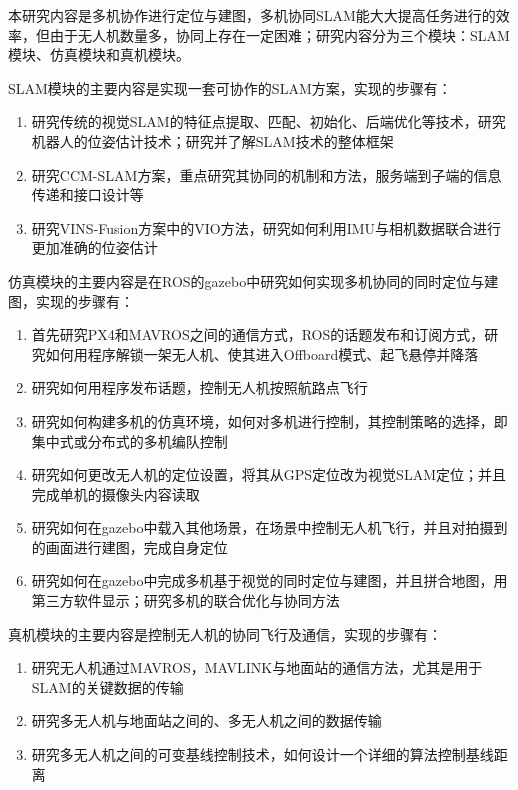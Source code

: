 本研究内容是多机协作进行定位与建图，多机协同SLAM能大大提高任务进行的效率，但由于无人机数量多，协同上存在一定困难；研究内容分为三个模块：SLAM模块、仿真模块和真机模块。

SLAM模块的主要内容是实现一套可协作的SLAM方案，实现的步骤有：

\begin{enumerate}
	\item 研究传统的视觉SLAM的特征点提取、匹配、初始化、后端优化等技术，研究机器人的位姿估计技术；研究并了解SLAM技术的整体框架
	\item 研究CCM-SLAM方案，重点研究其协同的机制和方法，服务端到子端的信息传递和接口设计等
	\item 研究VINS-Fusion方案中的VIO方法，研究如何利用IMU与相机数据联合进行更加准确的位姿估计
\end{enumerate}

仿真模块的主要内容是在ROS的gazebo中研究如何实现多机协同的同时定位与建图，实现的步骤有：

\begin{enumerate}
	\item 首先研究PX4和MAVROS之间的通信方式，ROS的话题发布和订阅方式，研究如何用程序解锁一架无人机、使其进入Offboard模式、起飞悬停并降落
	\item 研究如何用程序发布话题，控制无人机按照航路点飞行
	\item 研究如何构建多机的仿真环境，如何对多机进行控制，其控制策略的选择，即集中式或分布式的多机编队控制
	\item 研究如何更改无人机的定位设置，将其从GPS定位改为视觉SLAM定位；并且完成单机的摄像头内容读取
	\item 研究如何在gazebo中载入其他场景，在场景中控制无人机飞行，并且对拍摄到的画面进行建图，完成自身定位
	\item 研究如何在gazebo中完成多机基于视觉的同时定位与建图，并且拼合地图，用第三方软件显示；研究多机的联合优化与协同方法
\end{enumerate}

真机模块的主要内容是控制无人机的协同飞行及通信，实现的步骤有：

\begin{enumerate}
	\item 研究无人机通过MAVROS，MAVLINK与地面站的通信方法，尤其是用于SLAM的关键数据的传输
	\item 研究多无人机与地面站之间的、多无人机之间的数据传输
	\item 研究多无人机之间的可变基线控制技术，如何设计一个详细的算法控制基线距离
\end{enumerate}

